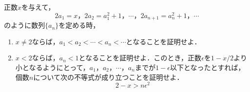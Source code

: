 \documentclass[a4j]{jarticle}
\begin{document}

     \begin{oframed}
     正数$x$を与えて，
          \[2a_1=x，2a_2=a_1^2+1，\cdots，2a_{n+1}=a_n^2+1，\cdots\]
     のように数列$\{a_n\}$を定める時，
          \begin{enumerate}[(1)]
          \item $x\not=2$ならば，$a_1<a_2<\cdots<a_n<\cdots$となることを証明せよ．
          \item $x<2$ならば，$a_n<1$となることを証明せよ．このとき，正数$\epsilon$を$1-x/2$より
          小となるようにとって，$a_1，a_2，\cdots，a_n$までが$1-\epsilon$以下となったとすれば，
          個数$n$について次の不等式が成り立つことを証明せよ．
               \[2-x>n\epsilon^2\]
          \end{enumerate}
     \end{oframed}
\end{document}

